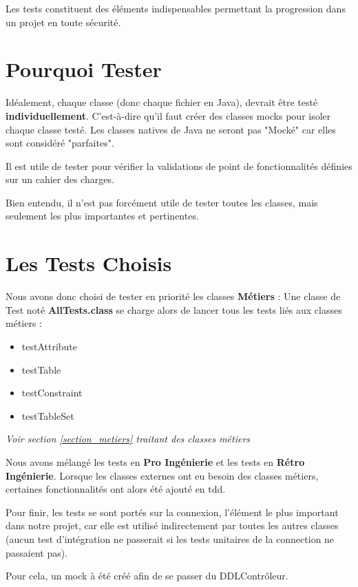 Les tests constituent des éléments indispensables permettant la progression dans un projet en toute sécurité.
\section{Pourquoi Tester}

Idéalement, chaque classe (donc chaque fichier en Java), devrait être testé \textbf{individuellement}. C'est-à-dire qu'il faut créer des classes \Glspl{mock} pour isoler chaque classe testé.
Les classes natives de Java ne seront pas "Mocké" car elles sont considéré "parfaites".

Il est utile de tester pour vérifier la validations de point de fonctionnalités définies sur un cahier des charges.

Bien entendu, il n'est pas forcément utile de tester toutes les classes, mais seulement les plus importantes et pertinentes.

\section{Les Tests Choisis}

Nous avons donc choisi de tester en priorité les classes \textbf{Métiers} : Une classe de Test noté \textbf{AllTests.class} se charge alors de lancer tous les tests liés aux classes métiers : 
\begin{itemize}
	\item testAttribute
	\item testTable
	\item testConstraint
	\item testTableSet
\end{itemize}

\textit{Voir section \ref{section_metiers} traitant des classes métiers}


Nous avons mélangé les tests en \textbf{Pro Ingénierie} et les tests en \textbf{Rétro Ingénierie}. 
Lorsque les classes externes ont eu besoin des classes métiers, certaines fonctionnalités ont alors été ajouté en \gls{tdd}.

Pour finir, les tests se sont portés sur la connexion, l'élément le plus important dans notre projet, 
car elle est utilisé indirectement par toutes les autres classes (aucun test d'intégration ne passerait 
si les tests unitaires de la connection ne passaient pas).

Pour cela, un \Gls{mock} à été créé afin de se passer du DDLContrôleur.

